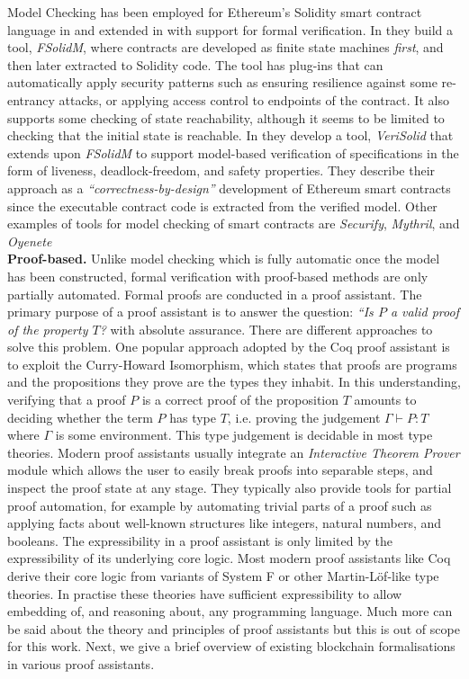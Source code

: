 \documentclass[twoside,11pt,openright]{report}
\begin{document}
Model Checking has been employed for Ethereum's Solidity smart contract language in \cite{fsolidm18} and extended in \cite{inbook} with support for formal verification. In \cite{fsolidm18} they build a tool, \textit{FSolidM}, where contracts are developed as finite state machines \textit{first}, and then later extracted to Solidity code. The tool has plug-ins that can automatically apply security patterns such as ensuring resilience against some re-entrancy attacks, or applying access control to endpoints of the contract. It also supports some checking of state reachability, although it seems to be limited to checking that the initial state is reachable. In \cite{inbook} they develop a tool, \textit{VeriSolid} that extends upon \textit{FSolidM} to support model-based verification of specifications in the form of liveness, deadlock-freedom, and safety properties. They describe their approach as a \textit{``correctness-by-design''} development of Ethereum smart contracts since the executable contract code is extracted from the verified model. Other examples of tools for model checking of smart contracts are \textit{Securify}\cite{tsankov2018securify}, \textit{Mythril}\cite{mueller2018smashing}, and \textit{Oyenete}\cite{luu2016making}
\medskip\\
\textbf{Proof-based.} Unlike model checking which is fully automatic once the model has been constructed, formal verification with proof-based methods are only partially automated. Formal proofs are conducted in a proof assistant. The primary purpose of a proof assistant is to answer the question: \textit{``Is $P$ a valid proof of the property $T$?} with absolute assurance. There are different approaches to solve this problem. One popular approach adopted by the Coq proof assistant is to exploit the Curry-Howard Isomorphism, which states that proofs are programs and the propositions they prove are the types they inhabit. In this understanding, verifying that a proof $P$ is a correct proof of the proposition $T$ amounts to deciding whether the term $P$ has type $T$, i.e. proving the judgement $\Gamma \vdash P : T$ where $\Gamma$ is some environment. This type judgement is decidable in most type theories. Modern proof assistants usually integrate an \textit{Interactive Theorem Prover} module which allows the user to easily break proofs into separable steps, and inspect the proof state at any stage. They typically also provide tools for partial proof automation, for example by automating trivial parts of a proof such as applying facts about well-known structures like integers, natural numbers, and booleans. The expressibility in a proof assistant is only limited by the expressibility of its underlying core logic. Most modern proof assistants like Coq derive their core logic from variants of System F or other Martin-L\"of-like type theories. In practise these theories have sufficient expressibility to allow embedding of, and reasoning about, any programming language. Much more can be said about the theory and principles of proof assistants but this is out of scope for this work. Next, we give a brief overview of existing blockchain formalisations in various proof assistants. 
\end{document}
